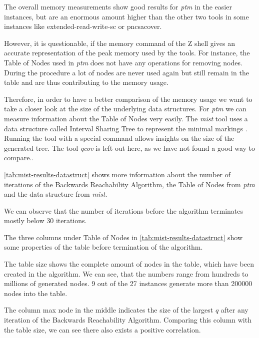 The overall memory measurements show good results for \textit{ptm} in the easier instances, but are an enormous amount higher than the other two tools in some instances like extended-read-write-sc or pncsacover.

\bigbreak

However, it is questionable, if the memory command of the Z shell gives an accurate representation of the peak memory used by the tools. For instance, the Table of Nodes used in \textit{ptm} does not have any operations for removing nodes. During the procedure a lot of nodes are never used again but still remain in the table and are thus contributing to the memory usage.

Therefore, in order to have a better comparison of the memory usage we want to take a closer look at the size of the underlying data structures. For \textit{ptm} we can measure information about the Table of Nodes very easily. The \textit{mist} tool uses a data structure called Interval Sharing Tree to represent the minimal markings \cite{ganty_07,ganty_15}. Running the tool with a special command allows insights on the size of the generated tree. 
The tool \textit{qcov} is left out here, as we have not found a good way to compare..

\bigbreak

\autoref{tab:mist-results-datastruct} shows more information about the number of iterations of the Backwards Reachability Algorithm, the Table of Nodes from \textit{ptm} and the data structure from \textit{mist}.


We can observe that the number of iterations before the algorithm terminates mostly below 30 iterations.

The three columns under Table of Nodes in \autoref{tab:mist-results-datastruct} show some properties of the table before termination of the algorithm.

The table size shows the complete amount of nodes in the table, which have been created in the algorithm. We can see, that the numbers range from hundreds to millions of generated nodes. 9 out of the 27 instances generate more than 200000 nodes into the table.

The column max node in the middle indicates the size of the largest $q$ after any iteration of the Backwards Reachability Algorithm. Comparing this column with the table size, we can see there also exists a positive correlation. 

